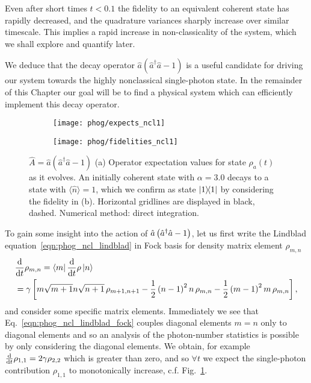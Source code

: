 Even after short times $t < 0.1$ the fidelity to an equivalent coherent state has rapidly decreased, and the quadrature variances sharply increase over similar timescale. This implies a rapid increase in non-classicality of the system, which we shall explore and quantify later.

We deduce that the decay operator $\hat{a}\left(\hat{a}^\dagger \hat{a} - 1\right)$ is a useful candidate for driving our system towards the highly nonclassical single-photon state. In the remainder of this Chapter our goal will be to find a physical system which can efficiently implement this decay operator.



\begin{figure}[htp]
\captionsetup{width=\linewidth}
\centering
	\begin{subfigure}{0.7\linewidth}
	\centering
	\caption{}
	\texttt{[image: phog/expects\_ncl1]}
	\end{subfigure}
	\begin{subfigure}{0.7\linewidth}
	\centering
	\caption{}
	\texttt{[image: phog/fidelities\_ncl1]}
	\end{subfigure}
\caption{\label{fig:phog_A_ncl}$\hat{A} = \hat{a}\left(\hat{a}^\dagger \hat{a} - 1\right)$ (a) Operator expectation values for state $\rho_a\left(t\right)$ as it evolves. An initially coherent state with $\alpha=3.0$ decays to a state with $\langle \hat{n}\rangle=1$, which we confirm as state $\dyad{1}$ by considering the fidelity in (b). Horizontal gridlines are displayed in black, dashed. Numerical method: direct integration.}
\end{figure}

To gain some insight into the action of $\hat{a}\left(\hat{a}^\dagger \hat{a} - 1\right)$, let us first write the Lindblad equation~\ref{eqn:phog_ncl_lindblad} in Fock basis for density matrix element $\rho_{m, n}$
\begin{align}\label{eqn:phog_ncl_lindblad_fock}
&\ddt \rho_{m, n} = \bra{m} \ddt \rho \ket{n} \notag  \\
%
&= \gamma \left[ m \sqrt{m+1} n \sqrt{n+1} \, \rho_{m+1, n+1} - \frac{1}{2} \left(n-1\right)^2 n\, \rho_{m, n} - \frac{1}{2} \left(m-1\right)^2 m\, \rho_{m, n}\right],
\end{align}
and consider some specific matrix elements. Immediately we see that Eq.~\ref{eqn:phog_ncl_lindblad_fock} couples diagonal elements $m=n$ only to diagonal elements and so an analysis of the photon-number statistics is possible by only considering the diagonal elements. We obtain, for example $\frac{\mathrm{d}}{\mathrm{d}t} \rho_{1, 1}=2 \gamma \rho_{2, 2}$ which is greater than zero, and so $\forall t$ we expect the single-photon contribution $\rho_{1,1}$ to monotonically increase, c.f. Fig.~\ref{fig:phog_A_ncl}. 

